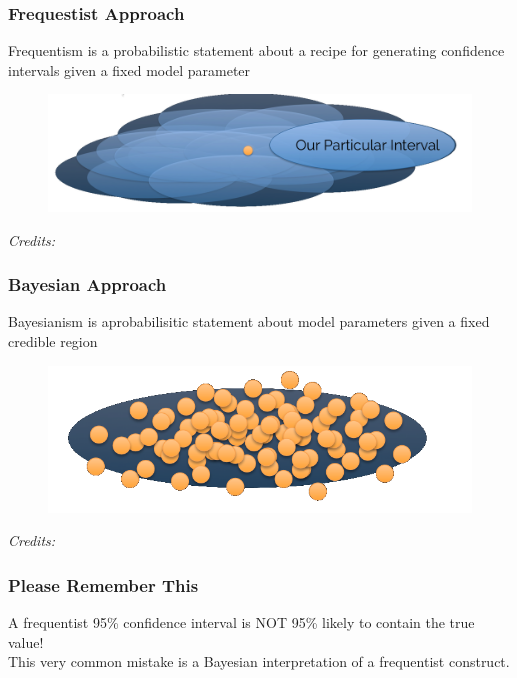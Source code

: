 \documentclass[handout]{beamer}\usepackage[]{graphicx}\usepackage[]{color}
\begin{document}

\begin{frame}
\frametitle{Frequestist Approach}

Frequentism is a probabilistic statement about a recipe for generating confidence intervals given a fixed model parameter
\pause
\begin{figure}
\centering
\includegraphics[scale=.25]{Frequentist2.png}
\end{figure}
{\tiny \textit{Credits:} \textcite{vanderplas2014}}
\end{frame}


\begin{frame}
\frametitle{Bayesian Approach}

\pause
Bayesianism is aprobabilisitic statement about model parameters given a fixed credible region
\pause

\begin{figure}
\centering
\includegraphics[scale=.25]{Bayesian2.png}
\end{figure}
{\tiny \textit{Credits:} \textcite{vanderplas2014}}


\end{frame}


\begin{frame}
\frametitle{Please Remember This}
\pause
A frequentist 95\% confidence interval is NOT 95\% likely to contain the true value! \\ 
\pause
\vskip 1cm
This very common mistake is a Bayesian interpretation of a frequentist construct. \\

\end{frame}
\end{document}
